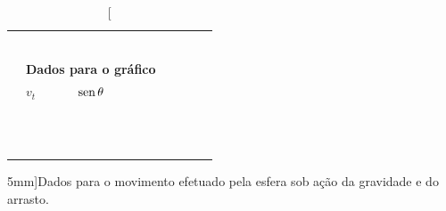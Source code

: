 \begin{table}[!h]
\begin{tabular}{lp{25mm}p{25mm}p{25mm}p{25mm}p{25mm}l}
	& \cellcolor[gray]{0.95} & \cellcolor[gray]{0.97} & \cellcolor[gray]{0.95} & \cellcolor[gray]{0.97} & \cellcolor[gray]{0.95} \\
	& \cellcolor[gray]{0.89} & \cellcolor[gray]{0.92} & \cellcolor[gray]{0.89} & \cellcolor[gray]{0.92} & \cellcolor[gray]{0.89} \\
	& \cellcolor[gray]{0.95} & \cellcolor[gray]{0.97} & \cellcolor[gray]{0.95} & \cellcolor[gray]{0.97} & \cellcolor[gray]{0.95} \\
	& \cellcolor[gray]{0.89} & \cellcolor[gray]{0.92} & \cellcolor[gray]{0.89} & \cellcolor[gray]{0.92} & \cellcolor[gray]{0.89} \\
	& \cellcolor[gray]{0.95} & \cellcolor[gray]{0.97} & \cellcolor[gray]{0.95} & \cellcolor[gray]{0.97} & \cellcolor[gray]{0.95} \\
	\cmidrule{2-6}
\\
	& \multicolumn{2}{l}{\textbf{Dados para o gráfico}} \\
	\cmidrule{2-3}
	& $v_t$ & $\operatorname{sen}\theta$ \\
	\cmidrule{2-3}
	& \cellcolor[gray]{0.89} & \cellcolor[gray]{0.92} \\
	& \cellcolor[gray]{0.95} & \cellcolor[gray]{0.97} \\
	& \cellcolor[gray]{0.89} & \cellcolor[gray]{0.92} \\
	& \cellcolor[gray]{0.95} & \cellcolor[gray]{0.97} \\
	& \cellcolor[gray]{0.89} & \cellcolor[gray]{0.92} \\
	& \cellcolor[gray]{0.95} & \cellcolor[gray]{0.97} \\
	& \cellcolor[gray]{0.89} & \cellcolor[gray]{0.92} \\
	& \cellcolor[gray]{0.95} & \cellcolor[gray]{0.97} \\
	& \cellcolor[gray]{0.89} & \cellcolor[gray]{0.92} \\
	& \cellcolor[gray]{0.95} & \cellcolor[gray]{0.97} \\
	& \cellcolor[gray]{0.89} & \cellcolor[gray]{0.92} \\
	& \cellcolor[gray]{0.95} & \cellcolor[gray]{0.97} \\
	\cmidrule{2-3}
\bottomrule
\end{tabular}
\caption[][5mm]{Dados para o movimento efetuado pela esfera sob ação da gravidade e do arrasto.}
\label{TabelaDados}
\end{table}
